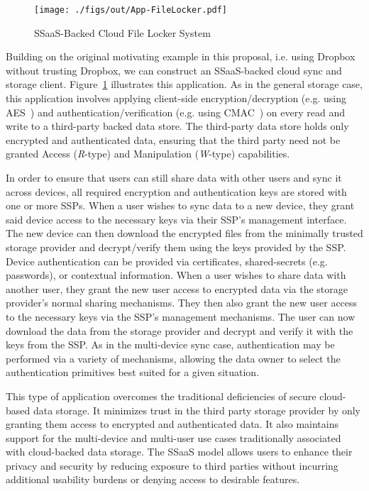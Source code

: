 \begin{figure}[t]
  \centering
  \texttt{[image: ./figs/out/App-FileLocker.pdf]}
  \caption{SSaaS-Backed Cloud File Locker System}
  \label{fig:apps-filestore}
\end{figure}

Building on the original motivating example in this proposal,
i.e. using Dropbox without trusting Dropbox, we can construct an
SSaaS-backed cloud sync and storage
client. Figure~\ref{fig:apps-filestore} illustrates this
application. As in the general storage case, this application involves
applying client-side encryption/decryption (e.g. using
AES~\cite{nist2001}) and authentication/verification (e.g. using
CMAC~\cite{dworkin2005}) on every read and write to a third-party
backed data store. The third-party data store holds only encrypted and
authenticated data, ensuring that the third party need not be granted
Access (\emph{R}-type) and Manipulation (\emph{W}-type) capabilities.

In order to ensure that users can still share data with other users
and sync it across devices, all required encryption and authentication
keys are stored with one or more SSPs. When a user wishes to sync data
to a new device, they grant said device access to the necessary keys
via their SSP's management interface. The new device can then download
the encrypted files from the minimally trusted storage provider and
decrypt/verify them using the keys provided by the SSP. Device
authentication can be provided via certificates, shared-secrets
(e.g. passwords), or contextual information. When a user wishes to
share data with another user, they grant the new user access to
encrypted data via the storage provider's normal sharing
mechanisms. They then also grant the new user access to the necessary
keys via the SSP's management mechanisms. The user can now download
the data from the storage provider and decrypt and verify it with the
keys from the SSP. As in the multi-device sync case, authentication
may be performed via a variety of mechanisms, allowing the data owner
to select the authentication primitives best suited for a given
situation.

This type of application overcomes the traditional deficiencies of
secure cloud-based data storage. It minimizes trust in the third party
storage provider by only granting them access to encrypted and
authenticated data. It also maintains support for the multi-device and
multi-user use cases traditionally associated with cloud-backed data
storage. The SSaaS model allows users to enhance their privacy and
security by reducing exposure to third parties without incurring
additional usability burdens or denying access to desirable features.

